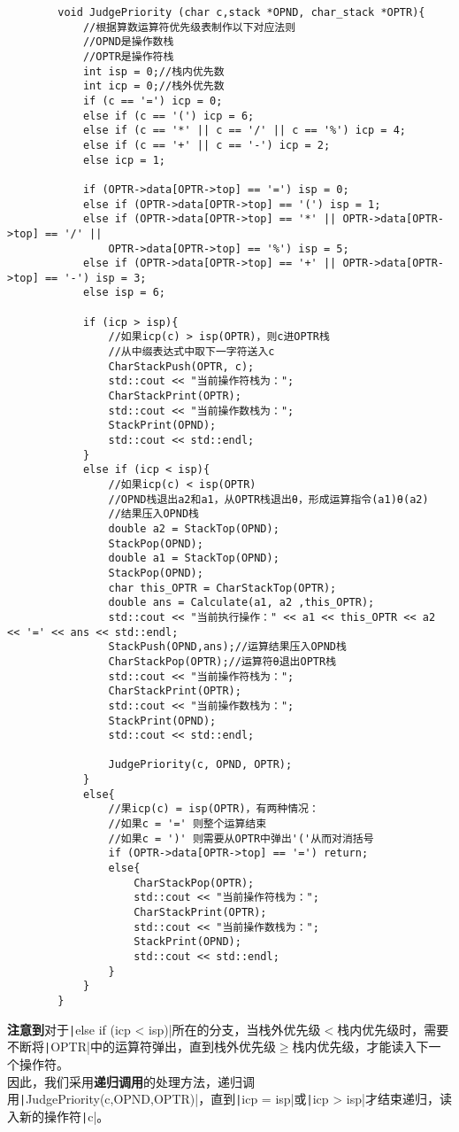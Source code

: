 \documentclass[10pt,a4paper]{article}
\begin{document}
	\begin{verbatim}
		void JudgePriority (char c,stack *OPND, char_stack *OPTR){
			//根据算数运算符优先级表制作以下对应法则
			//OPND是操作数栈
			//OPTR是操作符栈
			int isp = 0;//栈内优先数
			int icp = 0;//栈外优先数
			if (c == '=') icp = 0;
			else if (c == '(') icp = 6;
			else if (c == '*' || c == '/' || c == '%') icp = 4;
			else if (c == '+' || c == '-') icp = 2;
			else icp = 1;
			
			if (OPTR->data[OPTR->top] == '=') isp = 0;
			else if (OPTR->data[OPTR->top] == '(') isp = 1;
			else if (OPTR->data[OPTR->top] == '*' || OPTR->data[OPTR->top] == '/' ||
				OPTR->data[OPTR->top] == '%') isp = 5;
			else if (OPTR->data[OPTR->top] == '+' || OPTR->data[OPTR->top] == '-') isp = 3;
			else isp = 6;
			
			if (icp > isp){
				//如果icp(c) > isp(OPTR)，则c进OPTR栈
				//从中缀表达式中取下一字符送入c
				CharStackPush(OPTR, c);
				std::cout << "当前操作符栈为：";
				CharStackPrint(OPTR);
				std::cout << "当前操作数栈为：";
				StackPrint(OPND);
				std::cout << std::endl;
			}
			else if (icp < isp){
				//如果icp(c) < isp(OPTR)
				//OPND栈退出a2和a1，从OPTR栈退出θ，形成运算指令(a1)θ(a2)
				//结果压入OPND栈
				double a2 = StackTop(OPND);
				StackPop(OPND);
				double a1 = StackTop(OPND);
				StackPop(OPND);
				char this_OPTR = CharStackTop(OPTR);
				double ans = Calculate(a1, a2 ,this_OPTR);
				std::cout << "当前执行操作：" << a1 << this_OPTR << a2 << '=' << ans << std::endl;
				StackPush(OPND,ans);//运算结果压入OPND栈
				CharStackPop(OPTR);//运算符θ退出OPTR栈
				std::cout << "当前操作符栈为：";
				CharStackPrint(OPTR);
				std::cout << "当前操作数栈为：";
				StackPrint(OPND);
				std::cout << std::endl;
				
				JudgePriority(c, OPND, OPTR);
			}
			else{
				//果icp(c) = isp(OPTR)，有两种情况：
				//如果c = '=' 则整个运算结束
				//如果c = ')' 则需要从OPTR中弹出'('从而对消括号
				if (OPTR->data[OPTR->top] == '=') return;
				else{
					CharStackPop(OPTR);
					std::cout << "当前操作符栈为：";
					CharStackPrint(OPTR);
					std::cout << "当前操作数栈为：";
					StackPrint(OPND);
					std::cout << std::endl;
				}
			}
		}
	\end{verbatim}
	\textbf{注意到}对于\texttt|else if (icp < isp)|所在的分支，当栈外优先级$<$栈内优先级时，需要不断将\texttt|OPTR|中的运算符弹出，直到栈外优先级$\ge$栈内优先级，才能读入下一个操作符。\\
	因此，我们采用\textbf{递归调用}的处理方法，递归调用\texttt|JudgePriority(c,OPND,OPTR)|，直到\texttt|icp = isp|或\texttt|icp > isp|才结束递归，读入新的操作符\texttt|c|。
\end{document}
